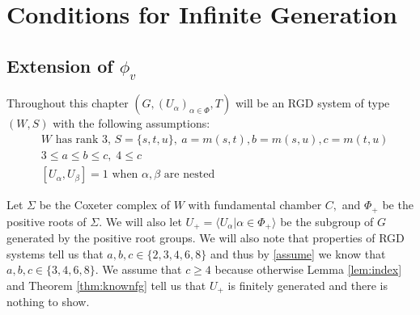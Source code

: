 \documentclass[class=book, crop=false,12 pt]{standalone}
\begin{document}
\chapter{Conditions for Infinite Generation}
\label{ch:general}
\section{Extension of $\phi_v$}

Throughout this chapter $(G,(U_\alpha)_{\alpha\in \Phi},T)$ will be an RGD system of type $(W,S)$ with the following assumptions:
\smallskip
\begin{equation}
	\label{assume}
	\tag{A} 
\begin{aligned}
	&W \text{ has rank 3, }S=\{s,t,u\},\: a=m(s,t),b=m(s,u),c=m(t,u)\\
	&3\le a\le b\le c,\;4\le c\\
	&[U_\alpha,U_\beta]=1\text{ when }\alpha,\beta \text{ are nested}
\end{aligned}
\end{equation}
\smallskip

Let $\Sigma$ be the Coxeter complex of $W$ with fundamental chamber $C,$ and $\Phi_+$ be the positive roots of $\Sigma.$ We will also let $U_+=\langle U_\alpha|\alpha\in \Phi_+\rangle$ be the subgroup of $G$ generated by the positive root groups. We will also note that properties of RGD systems tell us that $a,b,c\in \{2,3,4,6,8\}$ and thus by \eqref{assume} we know that $a,b,c\in \{3,4,6,8\}.$ We assume that $c\ge 4$ because otherwise Lemma \ref{lem:index} and Theorem \ref{thm:knownfg} tell us that $U_+$ is finitely generated and there is nothing to show.


\end{document}
